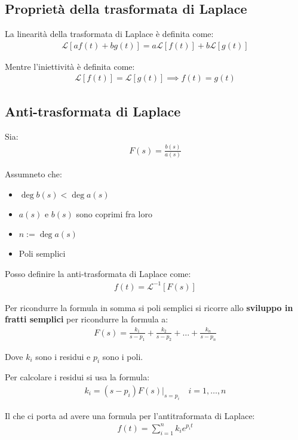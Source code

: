 \subsection{Proprietà della trasformata di Laplace}
La linearità della trasformata di Laplace è definita come:
\begin{align}
	\mathcal{L} [a f(t) + b g(t)] = a \mathcal{L} [f(t)] + b \mathcal{L} [g(t)]
\end{align}

Mentre l'iniettività è definita come:
\begin{align}
	\mathcal{L} [f(t)] = \mathcal{L} [g(t)] \implies f(t) = g(t)
\end{align}


\subsection{Anti-trasformata di Laplace}

Sia:
\begin{align}
	F(s) = \frac{b(s)}{a(s)}
\end{align}

Assumneto che:
\begin{itemize}
	\item $\deg b(s) < \deg a(s)$
	\item $a(s)$ e $b(s)$ sono coprimi fra loro
	\item $n := \deg a(s)$
	\item Poli semplici
\end{itemize}

Posso definire la anti-trasformata di Laplace come:
\begin{align}
	f(t) = \mathcal{L}^{-1} [F(s)]
\end{align}


Per ricondurre la formula in somma si poli semplici si ricorre allo \textbf{sviluppo in fratti semplici} per ricondurre la formula a:
\begin{align}
	F(s) = \frac{k_1}{s-p_1} + \frac{k_2}{s-p_2} + \dots + \frac{k_n}{s-p_n}
\end{align}

Dove $k_i$ sono i residui e $p_i$ sono i poli.

Per calcolare i residui si usa la formula:
\begin{align}
	k_i = (s - p_i) F(s) \bigg|_{s = p_i} \quad i = 1, \dots, n
\end{align}

Il che ci porta ad avere una formula per l'antitraformata di Laplace:
\begin{align}
	f(t) = \sum_{i=1}^{n} k_i e^{p_i t}
\end{align}


